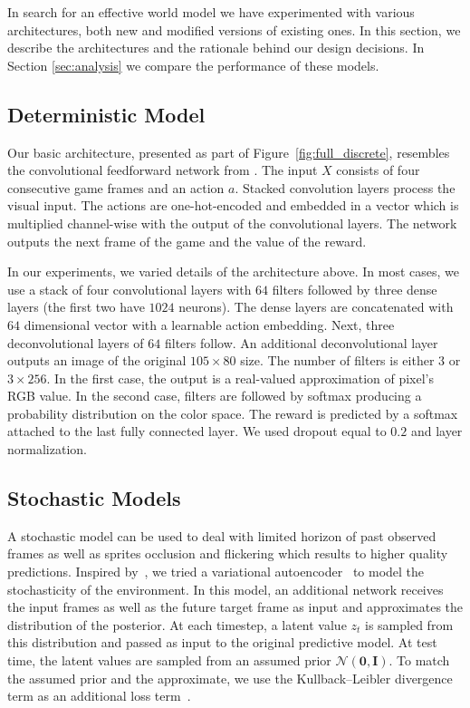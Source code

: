 In search for an effective world model we have experimented with various architectures, both new and modified versions of existing ones. In this section, we describe the architectures and the rationale behind our design decisions.  In Section \ref{sec:analysis} we compare the performance of these models.

\subsection{Deterministic Model}
Our basic architecture, presented as part of Figure~\ref{fig:full_discrete}, resembles the convolutional feedforward network from \citet{video_prediction}.  The input $X$ consists of four consecutive game frames and an action $a$. Stacked convolution layers process the visual input. The actions are one-hot-encoded and embedded in a vector which is multiplied channel-wise with the output of the convolutional layers. 
The network outputs the next frame of the game and the value of the reward.%

In our experiments, we varied details of the architecture above. In most cases, we use a stack of four convolutional layers with $64$ filters followed by three dense layers (the first two have $1024$ neurons). The dense layers are concatenated with $64$ dimensional vector with a learnable action embedding. Next, three deconvolutional layers of $64$ filters follow. An additional deconvolutional layer outputs an image of the original $105\times 80$ size. The number of filters is either $3$ or $3 \times 256$. In the first case, the output is a real-valued approximation of pixel's RGB value. In the second case, filters are followed by softmax producing a probability distribution on the color space. The reward is predicted by a softmax attached to the last fully connected layer. 
We used dropout equal to $0.2$ and layer normalization. 

\subsection{Stochastic Models}
A stochastic model can be used to deal with limited horizon of past observed frames as well as sprites occlusion and flickering which results to higher quality predictions. 
Inspired by~\citet{sv2p}, we tried a variational autoencoder~\citep{kingma2013auto} to model the stochasticity of the environment. In this model, an additional network receives the input frames as well as the future target frame as input and approximates the distribution of the posterior. At each timestep, a latent value $z_t$ is sampled from this distribution and passed as input to the original predictive model. At test time, the latent values are sampled from an assumed prior
$\mathcal{N}(\mathbf{0}, \mathbf{I})$. 
To match the assumed prior and the approximate, we use the Kullback–Leibler divergence term as an additional loss term~\citep{sv2p}.

